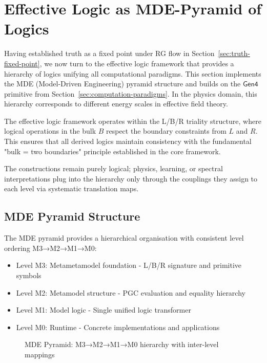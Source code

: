 \section{Effective Logic as MDE-Pyramid of Logics}
\label{sec:effective-logic}

Having established truth as a fixed point under RG flow in Section~\ref{sec:truth-fixed-point}, we now turn to the effective logic framework that provides a hierarchy of logics unifying all computational paradigms. This section implements the MDE (Model-Driven Engineering) pyramid structure and builds on the $\mathsf{Gen4}$ primitive from Section~\ref{sec:computation-paradigms}. In the physics domain, this hierarchy corresponds to different energy scales in effective field theory.

The effective logic framework operates within the L/B/R triality structure, where logical operations in the bulk $B$ respect the boundary constraints from $L$ and $R$. This ensures that all derived logics maintain consistency with the fundamental "bulk = two boundaries" principle established in the core framework.

The constructions remain purely logical; physics, learning, or spectral interpretations plug into the hierarchy only through the couplings they assign to each level via systematic translation maps.

\subsection{MDE Pyramid Structure}

\begin{definition}
\label{def:mde-pyramid}
The MDE pyramid provides a hierarchical organisation with consistent level ordering M3→M2→M1→M0:
\begin{itemize}
\item Level M3: Metametamodel foundation - L/B/R signature and primitive symbols
\item Level M2: Metamodel structure - PGC evaluation and equality hierarchy  
\item Level M1: Model logic - Single unified logic transformer
\item Level M0: Runtime - Concrete implementations and applications
\end{itemize}
\end{definition}

\begin{figure}[h]
\centering
{}
\caption{MDE Pyramid: M3→M2→M1→M0 hierarchy with inter-level mappings}
\end{figure}

